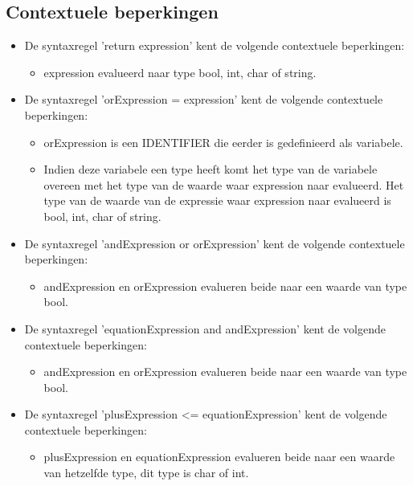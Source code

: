     \subsection{Contextuele beperkingen}
        \begin{itemize}
        \item De syntaxregel 'return expression' kent de volgende contextuele beperkingen:
            \begin{itemize}
            \item expression evalueerd naar type bool, int, char of string.
            \end{itemize}
        \item De syntaxregel 'orExpression = expression' kent de volgende contextuele beperkingen:
            \begin{itemize}
            \item orExpression is een IDENTIFIER die eerder is gedefinieerd als variabele.
            \item Indien deze variabele een type heeft komt het type van de variabele overeen met het type van de waarde waar expression naar evalueerd. Het type van de waarde van de expressie waar expression naar evalueerd is bool, int, char of string.
            \end{itemize}
        \item De syntaxregel 'andExpression or orExpression' kent de volgende contextuele beperkingen:
            \begin{itemize}
             \item andExpression en orExpression evalueren beide naar een waarde van type bool.
            \end{itemize}
        \item De syntaxregel 'equationExpression and andExpression' kent de volgende contextuele beperkingen:
            \begin{itemize}
            \item andExpression en orExpression evalueren beide naar een waarde van type bool.
            \end{itemize}
        \item De syntaxregel 'plusExpression \textless{}= equationExpression' kent de volgende contextuele beperkingen:
            \begin{itemize}
            \item plusExpression en equationExpression evalueren beide naar een waarde van hetzelfde type, dit type is char of int.
            \end{itemize}

\end{itemize}
